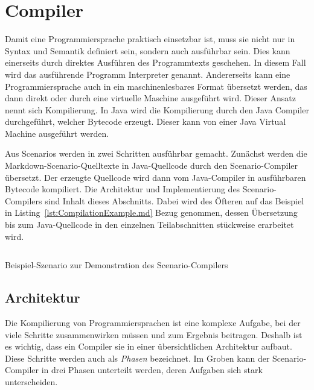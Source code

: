 \section{Compiler}\label{sec:compiler}

Damit eine Programmiersprache praktisch einsetzbar ist, muss sie nicht nur in Syntax und Semantik definiert sein, sondern auch ausführbar sein.
Dies kann einerseits durch direktes Ausführen des Programmtexts geschehen.
In diesem Fall wird das ausführende Programm Interpreter genannt.
Andererseits kann eine Programmiersprache auch in ein maschinenlesbares Format übersetzt werden, das dann direkt oder durch eine virtuelle Maschine ausgeführt wird.
Dieser Ansatz nennt sich Kompilierung.
In Java wird die Kompilierung durch den Java Compiler durchgeführt, welcher Bytecode erzeugt.
Dieser kann von einer Java Virtual Machine ausgeführt werden.

Aus Scenarios werden in zwei Schritten ausführbar gemacht.
Zunächst werden die Markdown-Scenario-Quelltexte in Java-Quellcode durch den Scenario-Compiler übersetzt.
Der erzeugte Quellcode wird dann vom Java-Compiler in ausführbaren Bytecode kompiliert.
Die Architektur und Implementierung des Scenario-Compilers sind Inhalt dieses Abschnitts.
Dabei wird des Öfteren auf das Beispiel in Listing~\ref{lst:CompilationExample.md} Bezug genommen, dessen Übersetzung bis zum Java-Quellcode in den einzelnen Teilabschnitten stückweise erarbeitet wird.

\begin{listing}[htp]
    \centering
    \inputminted{md}{chapter/fulib-scenarios/scenarios/CompilationExample.md}
    \vspace{-3ex}
    \caption{Beispiel-Szenario zur Demonstration des Scenario-Compilers}
    \label{lst:CompilationExample.md}
\end{listing}

\subsection{Architektur}\label{subsec:compiler-architecture}

Die Kompilierung von Programmiersprachen ist eine komplexe Aufgabe, bei der viele Schritte zusammenwirken müssen und zum Ergebnis beitragen.
Deshalb ist es wichtig, dass ein Compiler sie in einer übersichtlichen Architektur aufbaut.
Diese Schritte werden auch als \emph{Phasen}\cite[S.~4]{dragonbook} bezeichnet.
Im Groben kann der Scenario-Compiler in drei Phasen unterteilt werden, deren Aufgaben sich stark unterscheiden.

